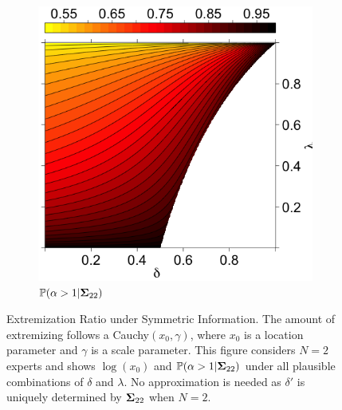 \documentclass[12pt]{article}
\renewcommand{\P}{\mathbb{P}}
\theoremstyle{definition}
\theoremstyle{definition}
\def\P{{\mathbb P}}
\begin{document}
\begin{figure}[t]
\begin{subfigure}[b]{0.49\textwidth}
                \includegraphics[width=\textwidth, height = \textwidth]{Probs}
\caption{$\P(\alpha > 1 | {\bf\Sigma}_{22})$}
\label{probOracle}
        \end{subfigure}

        \caption{Extremization Ratio under Symmetric Information. The amount of extremizing follows a Cauchy$(x_0, \gamma)$, where $x_0$ is a location parameter and $\gamma$ is a scale parameter. This figure considers  $N = 2$ experts and shows $\log(x_0)$ and $\P(\alpha > 1 | {\bf\Sigma}_{22})$ under all plausible combinations of $\delta$ and $\lambda$. No approximation is needed as $\delta'$ is uniquely determined by ${\bf\Sigma}_{22}$ when $N = 2$.}
        \label{LevelplotsOracle}
\end{figure}
\end{document}

